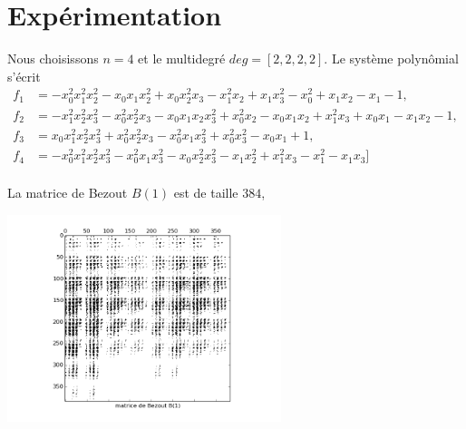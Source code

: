 \documentclass{standalone}
\begin{document}
  \section{Expérimentation}
  Nous choisissons $n=4$ et le multidegré $deg=[2,2,2,2]$. Le système polynômial s'écrit
  \begin{align}
  f_1 & =
  -x_0^2x_1^2x_2^2 - x_0x_1x_2^2 + x_0x_2^2x_3 - x_1^2x_2 + x_1x_3^2 - x_0^2 + x_1x_2 - x_1 - 1, \nonumber\\
  f_2 & =
   -x_1^2x_2^2x_3^2 - x_0^2x_2^2x_3 - x_0x_1x_2x_3^2 + x_0^2x_2 - x_0x_1x_2 + x_1^2x_3 + x_0x_1 - x_1x_2 - 1, \nonumber\\
   f_3 & =
   x_0x_1^2x_2^2x_3^2 + x_0^2x_2^2x_3 - x_0^2x_1x_3^2 + x_0^2x_3^2 - x_0x_1 + 1, \nonumber\\
   f_4 & =
   -x_0^2x_1^2x_2^2x_3^2 - x_0^2x_1x_3^2 - x_0x_2^2x_3^2 - x_1x_2^2 + x_1^2x_3 - x_1^2 - x_1x_3] \nonumber\\
   \end{align}

  La matrice de Bezout $B(1)$ est de taille $384$,
   \begin{center}
  \includegraphics[width=8cm]{../png/bez.png}
  \end{center}
\end{document}

